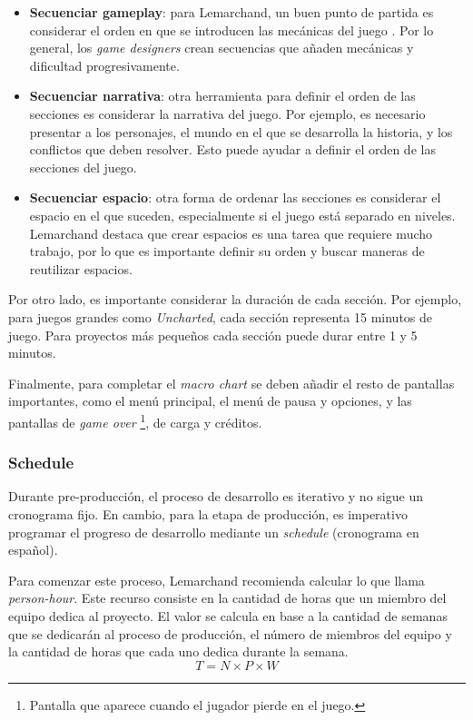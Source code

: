 \begin{itemize}
    \item \textbf{Secuenciar gameplay}: para Lemarchand, un buen punto de partida es considerar el orden en que se introducen las mecánicas del juego \cite{lemarchandPlayfulProductionProcess2021}. Por lo general, los \textit{game designers} crean secuencias que añaden mecánicas y dificultad progresivamente.
    \item \textbf{Secuenciar narrativa}: otra herramienta para definir el orden de las secciones es considerar la narrativa del juego. Por ejemplo, es necesario presentar a los personajes, el mundo en el que se desarrolla la historia, y los conflictos que deben resolver. Esto puede ayudar a definir el orden de las secciones del juego.
    \item \textbf{Secuenciar espacio}: otra forma de ordenar las secciones es considerar el espacio en el que suceden, especialmente si el juego está separado en niveles. Lemarchand destaca que crear espacios es una tarea que requiere mucho trabajo, por lo que es importante definir su orden y buscar maneras de reutilizar espacios.
\end{itemize}
\par Por otro lado, es importante considerar la duración de cada sección. Por ejemplo, para juegos grandes como \textit{Uncharted}, cada sección representa 15 minutos de juego. Para proyectos más pequeños cada sección puede durar entre 1 y 5 minutos.  %
\par Finalmente, para completar el \textit{macro chart} se deben añadir el resto de pantallas importantes, como el menú principal, el menú de pausa y opciones, y las pantallas de \textit{game over} \footnote{Pantalla que aparece cuando el jugador pierde en el juego.}, de carga y créditos.
%
%
\subsubsection{Schedule}
\par Durante pre-producción, el proceso de desarrollo es iterativo y no sigue un cronograma fijo. En cambio, para la etapa de producción, es imperativo programar el progreso de desarrollo mediante un \textit{schedule} (cronograma en español).
\par Para comenzar este proceso, Lemarchand recomienda calcular lo que llama \textit{person-hour}. Este recurso consiste en la cantidad de horas que un miembro del equipo dedica al proyecto. El valor se calcula en base a la cantidad de semanas que se dedicarán al proceso de producción, el número de miembros del equipo y la cantidad de horas que cada uno dedica durante la semana.
\begin{equation}
    T = N \times P \times W
\end{equation}

